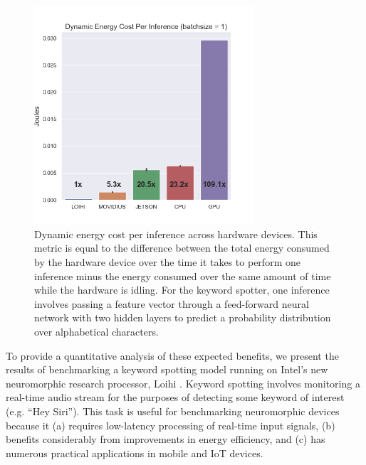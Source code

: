 \documentclass{article}
\begin{document}
\begin{figure}[ht!]
\centering
    \includegraphics[width=3.2in]{./figures/per_inf_comparison.png}
    \caption{Dynamic energy cost per inference across hardware devices. This metric is equal to the difference between the total energy consumed by the hardware device over the time it takes to perform one inference minus the energy consumed over the same amount of time while the hardware is idling. For the keyword spotter, one inference involves passing a feature vector through a feed-forward neural network with two hidden layers to predict a probability distribution over alphabetical characters.}
\label{per_inf_fig}
\end{figure}

To provide a quantitative analysis of these expected benefits, we present the results of benchmarking a keyword spotting model running on Intel's new neuromorphic research processor, Loihi \cite{Davies:2018}. Keyword spotting involves monitoring a real-time audio stream for the purposes of detecting some keyword of interest (e.g. ``Hey Siri''). This task is useful for benchmarking neuromorphic devices because it (a) requires low-latency processing of real-time input signals, (b) benefits considerably from improvements in energy efficiency, and (c) has numerous practical applications in mobile and IoT devices.
\end{document}
